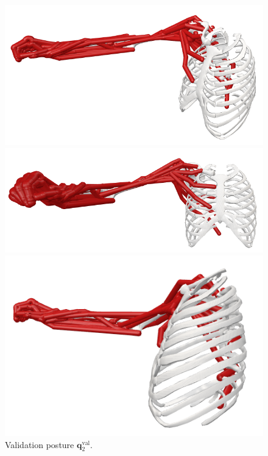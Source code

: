 \begin{figure}[!htb]
    \centering
    \captionsetup{justification=centering}
    \begin{minipage}{0.35\linewidth}
        \centering
        \includegraphics[trim={0 0 0 0}, clip, width=0.9\linewidth]{img/chapter_4/pose_7_view.png}
    \end{minipage}
    \hfill
    \begin{minipage}{0.35\linewidth}
        \captionsetup{justification=centering}
        \centering
        \includegraphics[trim={0 0 0 0}, clip, width=1\linewidth]{img/chapter_4/pose_7_front.png}
    \end{minipage}
    \hfill
    \begin{minipage}{0.25\linewidth}
        \captionsetup{justification=centering}
        \centering
        \includegraphics[trim={0 0 0 0}, clip, width=0.9\linewidth]{img/chapter_4/pose_7_side.png}
    \end{minipage}
    \caption{Validation posture $\mathbf{q}_2^{\text{val}}$.}
    \label{fig:pose_val_2}
\end{figure}

